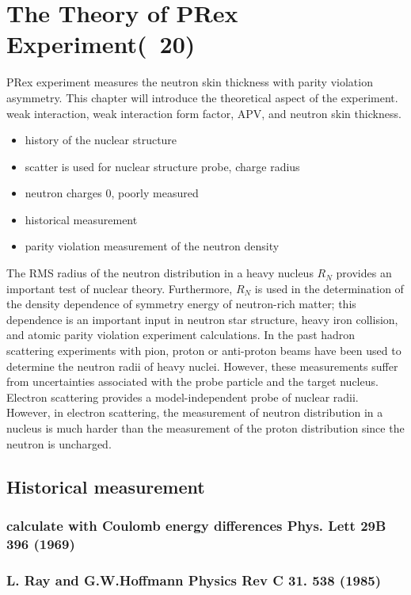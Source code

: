 \chapter{The Theory of PRex Experiment(~20)}

PRex experiment measures the neutron skin thickness with parity violation asymmetry. This chapter will introduce the theoretical aspect of the experiment. weak interaction, weak interaction form factor, APV, and neutron skin thickness.

\begin{itemize}
    \item history of the nuclear structure
    \item scatter is used for nuclear structure probe, charge radius 
    \item neutron charges 0, poorly measured
    \item historical measurement 
    \item parity violation measurement of the neutron density
\end{itemize}

The RMS radius of the  neutron distribution in a heavy nucleus  $R_N$ provides an important test of nuclear theory. Furthermore,   $R_N$ is used in the determination of  the density dependence of symmetry energy of neutron-rich matter; this dependence is an  important input in   neutron star structure, heavy iron collision, and atomic parity violation experiment calculations. In the past hadron scattering experiments with pion, proton or anti-proton beams have been used to determine the neutron radii of heavy nuclei. However, these measurements suffer from uncertainties associated with the probe particle and the target nucleus. Electron scattering provides a model-independent probe of nuclear radii.  However, in electron scattering, the measurement of neutron distribution in a nucleus  is much harder than the measurement of the proton distribution  since the neutron is uncharged. 


\section{Historical measurement}
\subsection{calculate with Coulomb energy differences Phys. Lett 29B 396 (1969)}
\subsection{L. Ray and G.W.Hoffmann Physics Rev C 31. 538 (1985)}

